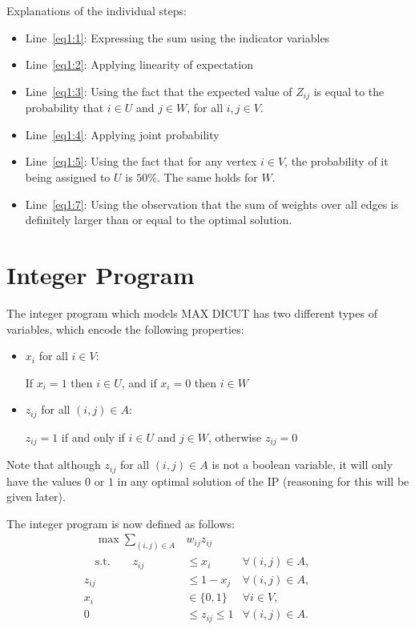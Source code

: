 \documentclass{article}
\begin{document}
Explanations of the individual steps:
\begin{itemize}
    \item Line~\ref{eq1:1}: Expressing the sum using the indicator variables
    \item Line~\ref{eq1:2}: Applying linearity of expectation
    \item Line~\ref{eq1:3}: Using the fact that the expected value of $Z_{ij}$ is equal to the probability that $i \in U$ and $j \in W$, for all $i,j \in V$.
    \item Line~\ref{eq1:4}: Applying joint probability
    \item Line~\ref{eq1:5}: Using the fact that for any vertex $i \in V$, the probability of it being assigned to $U$ is $50\%$. The same holds for $W$. 
    \item Line~\ref{eq1:7}: Using the observation that the sum of weights over all edges is definitely larger than or equal to the optimal solution.
\end{itemize}

\section{Integer Program}

The integer program which models MAX DICUT has two different types of variables, which encode the following properties:
\begin{itemize}
    \item $x_i$ for all $i \in V$:  
    
    If $x_i = 1$ then $i \in U$, and if $x_i = 0$ then $i \in W$

    \item $z_{ij}$ for all $(i,j) \in A$: 
    
    $z_{ij} = 1$ if and only if $i \in U$ and $j \in W$, otherwise $z_{ij} = 0$
\end{itemize}

Note that although $z_{ij}$ for all $(i,j) \in A$ is not a boolean variable, it will only have the values $0$ or $1$ in any optimal solution of the IP (reasoning for this will be given later).

The integer program is now defined as follows:
\begin{align}
    \quad\max \sum_{(i,j) \in A} &w_{ij}z_{ij} \label{eq2:1}\\
    \quad\text{s.t.}\quad\quad z_{ij} &\le x_i &\forall(i,j) \in A,\quad\quad\label{eq2:2}\\
    z_{ij} &\le 1 - x_j &\forall(i,j) \in A,\quad\quad\label{eq2:3}\\
    x_i &\in \{0,1\} &\forall i \in V,\quad\quad\label{eq2:4}\\
    0 &\le z_{ij} \le 1 &\forall(i,j) \in A.\quad\quad\label{eq2:5}
\end{align}
\newpage
\end{document}
